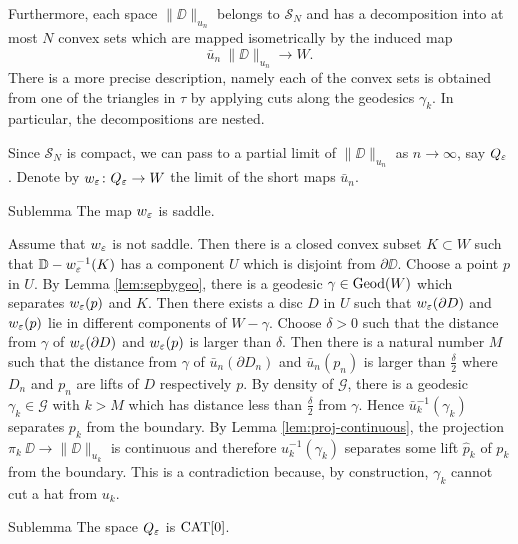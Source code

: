 \documentclass{article}
\begin{document}
Furthermore, each space $\|\DD\|_{u_n}$
belongs to $\mathcal{S}_N$ and has a decomposition into at most $N$ convex sets which are mapped isometrically by 
the induced map 
\[\bar u_n\:\|\DD\|_{u_n}\to W.\] 
There is a more precise description, namely each of the convex sets is 
obtained from one of the triangles in $\tau$ by applying cuts along the geodesics $\gamma_k$. 
In particular, the decompositions
are nested.

Since $\mathcal{S}_N$ is compact, we can pass to a partial limit of $\|\DD\|_{u_n}$ as $n\to\infty$,
say $Q_\varepsilon$.
Denote by $w_\varepsilon\colon Q_\varepsilon\to W$ the limit of the short maps $\bar u_n$.

\begin{thm}{Sublemma}
 The map $w_\varepsilon$ is saddle.
\end{thm}

Assume that $w_\varepsilon$ is not saddle.
Then there is a closed convex subset $K\subset W$ such that $\mathbb{D}-w_\varepsilon^{-1}(K)$
has a component $U$ which is disjoint from $\partial \DD$.
Choose a point $p$ in $U$.
By Lemma \ref{lem:sepbygeo}, there is  
a geodesic $\gamma\in\mathop{\rm Geod}\nolimits(W)$ which separates $w_\varepsilon(p)$ and $K$.
Then there exists a disc $D$ in $U$ such that
$w_\varepsilon(\partial D)$ and $w_\varepsilon(p)$ lie in different components of $W-\gamma$. 
Choose $\delta>0$ 
such that the distance from $\gamma$ of $w_\varepsilon(\partial D)$ and $w_\varepsilon(p)$ is larger than $\delta$.
Then there is a natural number $M$ such that the distance from $\gamma$ of $\bar u_n(\partial D_n)$ and $\bar u_n(p_n)$ is larger than $\frac{\delta}{2}$
where $D_n$ and $p_n$ are lifts of $D$ respectively $p$.
By density of $\mathcal{G}$, there is a geodesic $\gamma_k\in \mathcal{G}$ with $k>M$ which has distance less than $\frac{\delta}{2}$ from $\gamma$. 
Hence $\bar u_k^{-1}(\gamma_k)$ separates $p_k$ from the boundary. 
By Lemma \ref{lem:proj-continuous}, the projection $\pi_k\:\DD\to \|\DD\|_{u_k}$ is continuous
and therefore $u_k^{-1}(\gamma_k)$ separates some lift $\hat p_k$ of $p_k$ from the boundary.
This is a contradiction because, by construction, $\gamma_k$ cannot cut a hat from $u_k$.
\qeds

\begin{thm}{Sublemma}
The space $Q_\varepsilon$ is $\mathop{\rm CAT}\nolimits[0]$. 
\end{thm}
\end{document}

